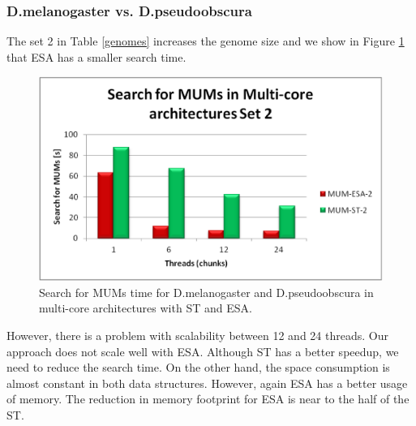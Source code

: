 \documentclass[runningheads,a5paper]{llncs}
\begin{document}
\subsubsection{D.melanogaster vs. D.pseudoobscura}
The set 2 in Table \ref{genomes} increases the genome size and we show in Figure \ref{fig:fly-mum} that ESA has a smaller search time.
 \begin{figure}[!h]
  \centering
  \includegraphics[scale=0.3]{fly-MUM.eps}
  \caption{Search for MUMs time for D.melanogaster and D.pseudoobscura in multi-core architectures with ST and ESA.}
  \label{fig:fly-mum}
\end{figure}  
However, there is a problem with scalability between 12 and 24 threads. Our approach does not scale well with ESA. Although ST has a better speedup, we need to reduce the search time.
On the other hand, the space consumption is almost constant in both data structures. However, again ESA has a better usage of memory. The reduction in memory footprint for ESA is near to the half of the ST.%
\end{document}
